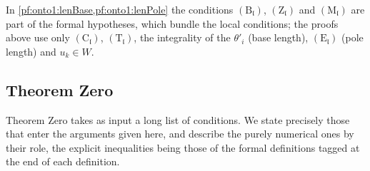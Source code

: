 \begin{remark}\label{pf:onto1:rem-lengths}
In \cref{pf:onto1:lenBase,pf:onto1:lenPole} the conditions $(\mathrm B_{\mathfrak l})$, $(\mathrm Z_{\mathfrak l})$ and $(\mathrm
M_{\mathfrak l})$ are part of the formal hypotheses, which bundle the local conditions; the proofs above use only
$(\mathrm C_{\mathfrak l})$, $(\mathrm T_{\mathfrak l})$, the integrality of the $\theta'_i$ (base length), $(\mathrm E_{\mathfrak l})$ (pole
length) and $u_k\in W$.
\end{remark}

\subsection{Theorem Zero}\label{sec:pf:onto1:thmzero}

Theorem Zero takes as input a long list of conditions. We state precisely those that enter the arguments
given here, and describe the purely numerical ones by their role, the explicit inequalities being those of the
formal definitions tagged at the end of each definition.

